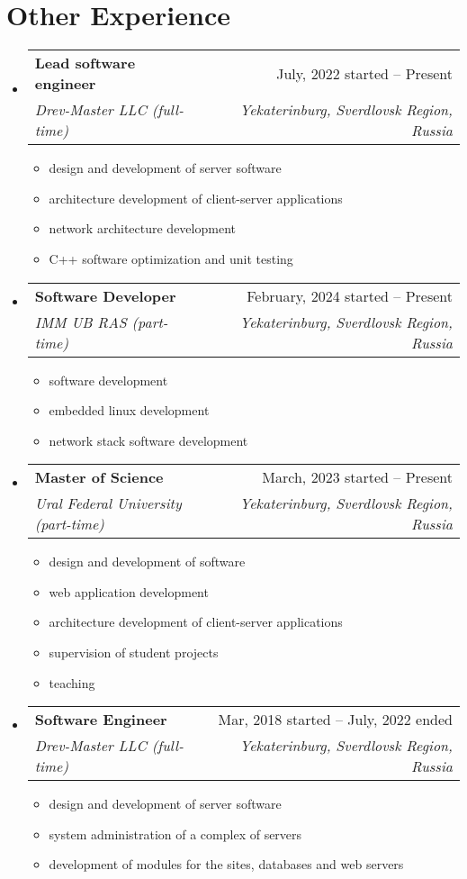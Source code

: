 \documentclass[letterpaper,11pt]{article}
\makeatletter
\newcommand{\resumeItem}[1]{
    \item{
                {#1 \vspace{-4pt}}
          }
}
\newcommand{\resumeSubheading}[4]{
    \vspace{-2pt}\item
    \begin{tabular*}{0.97\textwidth}[t]{l@{\extracolsep{\fill}}r}
        \textbf{#1} & #2 \\
        \textit{\small #3} & \textit{\small #4} \\
    \end{tabular*}\vspace{-10pt}
}
\newcommand{\resumeSubHeadingListStart}{\begin{itemize}[leftmargin=0.15in, label={}]}
\newcommand{\resumeSubHeadingListEnd}{\end{itemize}}
\newcommand{\resumeItemListStart}{\begin{itemize}}
\newcommand{\resumeItemListEnd}{\end{itemize}\vspace{-2pt}}
\makeatother
\begin{document}

\section{Other Experience}
\resumeSubHeadingListStart

\resumeSubheading
    {Lead software engineer}{July, 2022 started -- Present}
    {Drev-Master LLC (full-time)}{Yekaterinburg, Sverdlovsk Region, Russia}
    \resumeItemListStart
        \small\resumeItem{design and development of server software}
        \resumeItem{architecture development of client-server applications}
        \resumeItem{network architecture development}
        \resumeItem{C++ software optimization and unit testing}
    \resumeItemListEnd

\resumeSubheading
    {Software Developer}{February, 2024 started -- Present}
    {IMM UB RAS (part-time)}{Yekaterinburg, Sverdlovsk Region, Russia}
    \resumeItemListStart
        \small\resumeItem{software development}
        \resumeItem{embedded linux development}
        \resumeItem{network stack software development}
    \resumeItemListEnd

\resumeSubheading
    {Master of Science}{March, 2023 started -- Present}
    {Ural Federal University (part-time)}{Yekaterinburg, Sverdlovsk Region, Russia}
    \resumeItemListStart
        \small\resumeItem{design and development of software}
        \resumeItem{web application development}
        \resumeItem{architecture development of client-server applications}
        \resumeItem{supervision of student projects}
        \resumeItem{teaching}
    \resumeItemListEnd

\resumeSubheading
    {Software Engineer}{Mar, 2018 started -- July, 2022 ended}
    {Drev-Master LLC (full-time)}{Yekaterinburg, Sverdlovsk Region, Russia}
    \resumeItemListStart
        \small\resumeItem{design and development of server software}
        \resumeItem{system administration of a complex of servers}
        \resumeItem{development of modules for the sites, databases and web servers}
    \resumeItemListEnd


\resumeSubHeadingListEnd
\end{document}
